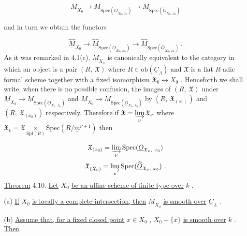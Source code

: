 \begin{equation*}
\underline{M}_{X_0} \to \underline{M}_{\mathrm{Spec}(\underline{O}_{X_0,\, x_0})} \to \underline{M}_{\mathrm{Spec}(\widehat{\underline{O}}_{X_0,\, x_0})} 
\end{equation*}


 and in turn we obtain the functors

\begin{equation*}
\widehat{\underline{M}}_{X_0} \to \widehat{\underline{M}}_{\mathrm{Spec}(\underline{O}_{X_0,\ x_0})} \to \widehat{\underline{M}}_{\mathrm{Spec}(\widehat{\underline{O}}_{X_0,\ x_0})}\ .
\end{equation*}
As it was remarked in 4.1(c), $\underline{M}_{X_0}$  is canonically equivalent to the category in which an object is a pair  $(R,\ \mathfrak{X})$  where  $R \in \mathrm{ob}(\underline{C}_{\Lambda})$  and  $\mathfrak{X}$  is a flat $R$-adic formal scheme together with a fixed isomorphism  $\mathfrak{X}_0 \longleftrightarrow X_0$ . Henceforth we shall write, when there is no possible confusion, the images of  $(R,\ \mathfrak{X})$  under $\underline{M}_{X_0} \to \underline{M}_{\mathrm{Spec}(\underline{O}_{X_0,\ x_0})}$  and  $\underline{M}_{X_0} \to \underline{M}_{\mathrm{Spec}(\underline{O}_{X_0,\ x_0})}$  by  $(R,\ \mathfrak{X}_{(x_0)})$  and  $(R,\ \mathfrak{X}_{(x_0)})$ respectively. Therefore if  $\mathfrak{X} = \varinjlim\limits_{\nu} \mathfrak{X}_{\nu}$  where  $\mathfrak{X}_{\nu} = \mathfrak{X} \underset{\mathrm{Spf}(R)}{\times} \mathrm{Spec}(R/\underline{m}^{\nu+1})$    then

\begin{equation*}
\mathfrak{X}_{(x_0)} = \varinjlim\limits_{\nu} \mathrm{Spec}(\underline{O}_{\mathfrak{X}_{\nu},\ x_0})
\end{equation*}
\begin{equation*}
\mathfrak{X}_{(\hat{X}_0)} = \varinjlim\limits_{\nu} \mathrm{Spec}(\widehat{\underline{O}}_{\mathfrak{X}_{\nu},\ x_0})\ .
\end{equation*}
\underline{Theorem} 4.10. \underline{Let}  $X_0$  \underline{be an affine scheme of finite type over}  $k$  .

(a)  \underline{If}  $X_0$  \underline{is locally a complete-intersection, then}  $\underline{M}_{X_0}$  \underline{is smooth over}  $\underline{C}_{\Lambda}$  .

(b)  \underline{Assume that, for a fixed closed point}  $x \in X_0$  ,  $X_0 - \{x\}$  \underline{is smooth over}  $k$  . \underline{Then}

